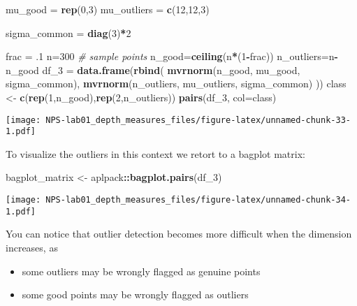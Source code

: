 \documentclass[
]{article}
\newenvironment{Shaded}{\begin{snugshade}}{\end{snugshade}}
\newcommand{\AttributeTok}[1]{\textcolor[rgb]{0.13,0.29,0.53}{#1}}
\newcommand{\CommentTok}[1]{\textcolor[rgb]{0.56,0.35,0.01}{\textit{#1}}}
\newcommand{\DecValTok}[1]{\textcolor[rgb]{0.00,0.00,0.81}{#1}}
\newcommand{\FunctionTok}[1]{\textcolor[rgb]{0.13,0.29,0.53}{\textbf{#1}}}
\newcommand{\NormalTok}[1]{#1}
\newcommand{\OtherTok}[1]{\textcolor[rgb]{0.56,0.35,0.01}{#1}}
\newcommand{\SpecialCharTok}[1]{\textcolor[rgb]{0.81,0.36,0.00}{\textbf{#1}}}
\providecommand{\tightlist}{%
  \setlength{\itemsep}{0pt}\setlength{\parskip}{0pt}}
\begin{document}
\begin{Shaded}
\begin{Highlighting}[]
\NormalTok{mu\_good }\OtherTok{=} \FunctionTok{rep}\NormalTok{(}\DecValTok{0}\NormalTok{,}\DecValTok{3}\NormalTok{)}
\NormalTok{mu\_outliers }\OtherTok{=} \FunctionTok{c}\NormalTok{(}\DecValTok{12}\NormalTok{,}\DecValTok{12}\NormalTok{,}\DecValTok{3}\NormalTok{)}

\NormalTok{sigma\_common }\OtherTok{=} \FunctionTok{diag}\NormalTok{(}\DecValTok{3}\NormalTok{)}\SpecialCharTok{*}\DecValTok{2}

\NormalTok{frac }\OtherTok{=}\NormalTok{ .}\DecValTok{1}
\NormalTok{n}\OtherTok{=}\DecValTok{300}
\CommentTok{\# sample points}
\NormalTok{n\_good}\OtherTok{=}\FunctionTok{ceiling}\NormalTok{(n}\SpecialCharTok{*}\NormalTok{(}\DecValTok{1}\SpecialCharTok{{-}}\NormalTok{frac))}
\NormalTok{n\_outliers}\OtherTok{=}\NormalTok{n}\SpecialCharTok{{-}}\NormalTok{n\_good}
\NormalTok{df\_3 }\OtherTok{=} \FunctionTok{data.frame}\NormalTok{(}\FunctionTok{rbind}\NormalTok{(}
  \FunctionTok{mvrnorm}\NormalTok{(n\_good, mu\_good, sigma\_common),}
  \FunctionTok{mvrnorm}\NormalTok{(n\_outliers, mu\_outliers, sigma\_common)}
\NormalTok{))}
\NormalTok{class }\OtherTok{\textless{}{-}} \FunctionTok{c}\NormalTok{(}\FunctionTok{rep}\NormalTok{(}\DecValTok{1}\NormalTok{,n\_good),}\FunctionTok{rep}\NormalTok{(}\DecValTok{2}\NormalTok{,n\_outliers))}
\FunctionTok{pairs}\NormalTok{(df\_3, }\AttributeTok{col=}\NormalTok{class)}
\end{Highlighting}
\end{Shaded}

\texttt{[image: NPS-lab01\_depth\_measures\_files/figure-latex/unnamed-chunk-33-1.pdf]}

To visualize the outliers in this context we retort to a bagplot matrix:

\begin{Shaded}
\begin{Highlighting}[]
\NormalTok{bagplot\_matrix }\OtherTok{\textless{}{-}}\NormalTok{ aplpack}\SpecialCharTok{::}\FunctionTok{bagplot.pairs}\NormalTok{(df\_3)}
\end{Highlighting}
\end{Shaded}

\texttt{[image: NPS-lab01\_depth\_measures\_files/figure-latex/unnamed-chunk-34-1.pdf]}

You can notice that outlier detection becomes more difficult when the
dimension increases, as

\begin{itemize}
\tightlist
\item
  some outliers may be wrongly flagged as genuine points
\item
  some good points may be wrongly flagged as outliers
\end{itemize}
\end{document}
